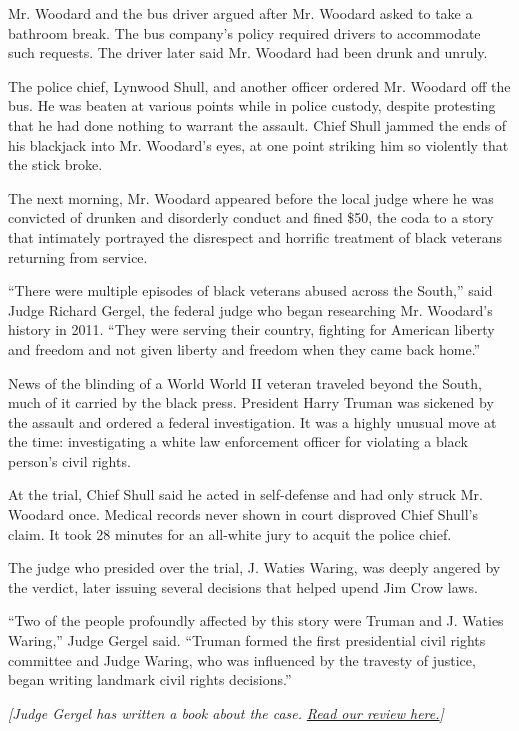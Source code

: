 Mr. Woodard and the bus driver argued after Mr. Woodard asked to take a
bathroom break. The bus company's policy required drivers to accommodate
such requests. The driver later said Mr. Woodard had been drunk and
unruly.

The police chief, Lynwood Shull, and another officer ordered Mr. Woodard
off the bus. He was beaten at various points while in police custody,
despite protesting that he had done nothing to warrant the assault.
Chief Shull jammed the ends of his blackjack into Mr. Woodard's eyes, at
one point striking him so violently that the stick broke.

The next morning, Mr. Woodard appeared before the local judge where he
was convicted of drunken and disorderly conduct and fined \$50, the coda
to a story that intimately portrayed the disrespect and horrific
treatment of black veterans returning from service.

``There were multiple episodes of black veterans abused across the
South,'' said Judge Richard Gergel, the federal judge who began
researching Mr. Woodard's history in 2011. ``They were serving their
country, fighting for American liberty and freedom and not given liberty
and freedom when they came back home.''

News of the blinding of a World World II veteran traveled beyond the
South, much of it carried by the black press. President Harry Truman was
sickened by the assault and ordered a federal investigation. It was a
highly unusual move at the time: investigating a white law enforcement
officer for violating a black person's civil rights.

At the trial, Chief Shull said he acted in self-defense and had only
struck Mr. Woodard once. Medical records never shown in court disproved
Chief Shull's claim. It took 28 minutes for an all-white jury to acquit
the police chief.

The judge who presided over the trial, J. Waties Waring, was deeply
angered by the verdict, later issuing several decisions that helped
upend Jim Crow laws.

``Two of the people profoundly affected by this story were Truman and J.
Waties Waring,'' Judge Gergel said. ``Truman formed the first
presidential civil rights committee and Judge Waring, who was influenced
by the travesty of justice, began writing landmark civil rights
decisions.''

\emph{{[}Judge Gergel has written a book about the case.}
\href{https://www.nytimes3xbfgragh.onion/2019/02/07/books/review/richard-gergel-unexampled-courage.html}{\emph{Read
our review here.}}\emph{{]}}

